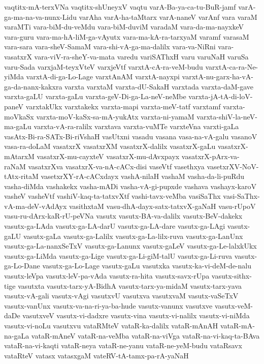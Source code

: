 {vaqtitx-mA-terxVNa
vaqtitx-shUneyxV
vaqtu
varA-Ba-ya-ca-tu-BuR-jamf
varA-ga-ma-na-va-nunx-Lidu
varAha
varA-ha-taMtarx
varA-naneV
varAnf
vara
varaM
varaMTi
vara-biM-du-veMdu
vara-biM-duviM
varadaM
vara-da-ma-nayxkeV
vara-guru
vara-ma-hA-liM-ga-vAyutx
vara-ma-kA-ra-tarxyaM
varamf
varasaM
vara-sara
vara-sheV-SamaM
vara-shi-vA-ga-ma-dalilx
vara-va-NiRni
vara-vasatxrX
vara-viV-ra-sheY-va-mata
varedu
variSAThxH
varu
varuNaH
varuSa
varu-Sada
varxjaM-teyxVteV
varxjeVtf
varxtA-cA-ra-veM-budu
varxtA-ca-ra-Ne-yiMda
varxtA-di-ga-Lo-Lage
varxtAnAM
varxtA-nayxpi
varxtA-nu-garx-ha-vA-ga-da-nanx-kakxra
varxta
varxtaM
varxta-dU-SakaH
varxtada
varxta-daM-gave
varxta-gaLU
varxta-gaLu
varxta-geV-Di-ga-La-neV-neMbe
varxta-jA-tA-di-loV-paneV
varxtakUkx
varxtakekx
varxta-mapi
varxta-meV-tatf
varxtamf
varxta-moVkaSx
varxta-moV-kaSx-sa-mA-yukAtx
varxta-ni-yamaM
varxta-shiV-la-neV-ma-gaLu
varxta-vA-ra-ralilx
varxtava
varxta-vuMTe
varxteVna
varxti-gaLa
vasAtx-Bi-ra-SATx-Bi-riVshaH
vasUtxni
vasadu
vasana
vasa-na-vA-galu
vasanoV
vasa-ra-doLaM
vasatxrX
vasatxrXM
vasatxrX-dalilx
vasatxrX-gaLu
vasatxrX-mAtarxM
vasatxrX-mu-cayxteV
vasatxrX-mu-dAvxpayx
vasatxrX-pArx-va-raNaM
vasatxrXva
vasatxrX-va-nA-cACx-disi
vaseVtf
vasethxya
vasetxrXV-NoV-tAtx-ritaM
vasetxrXY-rA-cACxdayx
vashA-nilaH
vashaM
vasha-da-li-puRdu
vasha-diMda
vashakekx
vasha-mADi
vasha-vA-gi-pupxde
vashava
vashayx-karoV
vasheV
vasheVtf
vashiV-kaq-ta-tatxvXtf
vashi-tavx-veMba
vasiSaThx
vasi-SaThx-vA-ma-deV-vAdAyx
vasithxtaM
vasu-dhA-dayx-satx-tatxvX-gaNaH
vasu-rUpoV
vasu-ru-dArx-kaR-rU-peVNa
vasutx
vasutx-BA-va-dalilx
vasutx-BeV-dakekx
vasutx-ga-LAda
vasutx-ga-LA-darU
vasutx-ga-LA-dare
vasutx-ga-LAgi
vasutx-gaLU
vasutx-gaLa
vasutx-ga-Lalilx
vasutx-ga-La-lilx-ruva
vasutx-ga-LanUnx
vasutx-ga-La-nanxSeTxV
vasutx-ga-Lanunx
vasutx-gaLeV
vasutx-ga-Le-lalxkUkx
vasutx-ga-LiMda
vasutx-ga-Lige
vasutx-ga-Li-giM-talU
vasutx-ga-Li-ruva
vasutx-ga-Lo-Dane
vasutx-ga-Lo-Lage
vasutx-gaLu
vasutxka
vasutx-ka-vi-deM-de-nalu
vasutx-leVpa
vasutx-leV-pa-vAda
vasutx-ra-hita
vasutx-savx-rUpa
vasutx-sithx-tige
vasutxta
vasutx-tarx-yA-BidhA
vasutx-tarx-ya-midaM
vasutx-tarx-yava
vasutx-vA-gali
vasutx-vAgi
vasutxvU
vasutxva
vasutxvaM
vasutx-vaSeTxV
vasutx-vanUnx
vasutx-va-na-ri-ya-ba-hude
vasutx-vanunx
vasutxve
vasutx-veM-daDe
vasutxveV
vasutx-vi-dadxre
vasutx-vina
vasutx-vi-nalilx
vasutx-vi-niMda
vasutx-vi-noLu
vasutxvu
vataRMteV
vataR-ka-dalilx
vataR-mAnAH
vataR-mA-na-gaLa
vataR-mAneV
vataR-na-veMba
vataR-na-viVga
vataR-na-vi-kaq-ta-BAva
vataR-na-vi-kaqti
vataR-neya
vataR-ne-yanu
vataR-ne-yeM-budu
vataRsavx
vataRteV
vatasx
vatasxgaM
vateRV-tA-tamx-pa-rA-yaNaH
}
